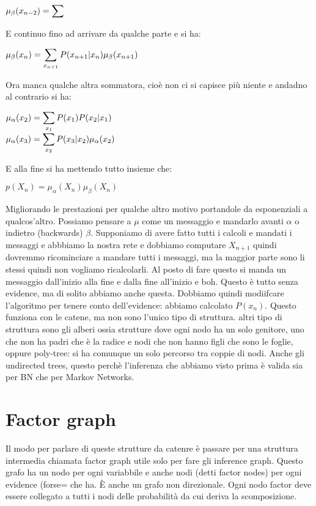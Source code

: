 \begin{center}
	$\displaystyle \mu_\beta(x_{n-2})=\displaystyle\sum$
\end{center}
E continuo fino ad arrivare da qualche parte e si ha:
\begin{center}
	$\displaystyle \mu_\beta(x_n)=\displaystyle\sum_{x_{n+1}}P(x_{n+1}\vert x_n)\mu_\beta(x_{n+1})$
\end{center}
Ora manca qualche altra sommatora, cioè non ci si capisce più niente e andadno al contrario si ha:
\begin{center}
	$\displaystyle \mu_\alpha(x_2)=\displaystyle\sum_{x_1}P(x_1)P(x_2\vert x_1)$\\
	$\displaystyle \mu_\alpha(x_3)=\displaystyle\sum_{x_2}P(x_3\vert x_2)\mu_\alpha(x_2)$
\end{center}
E alla fine si ha mettendo tutto insieme che:
\begin{center}
	$\displaystyle p(X_n)=\mu_\alpha(X_n)\mu_\beta(X_n)$
\end{center}
Migliorando le prestazioni per qualche altro motivo portandole da esponenziali a qualcos'altro.\newline 
Possiamo pensare a $\mu$ come un messaggio e mandarlo avanti $\alpha$ o indietro (backwards) $\beta$.\newline
Supponiamo di avere fatto tutti i calcoli e mandati i messaggi e abbbiamo la nostra rete e dobbiamo computare $X_{n+1}$ quindi dovremmo ricominciare a mandare tutti i messaggi, ma la maggior parte sono li stessi quindi non vogliamo ricalcolarli. Al posto di fare questo si manda un messaggio dall'inizio alla fine e dalla fine all'inizio e boh. \newline
Questo è tutto senza evidence, ma di solito abbiamo anche questa. Dobbiamo quindi modiifcare l'algoritmo per tenere conto dell'evidence: abbiamo calcolato $P(x_n)$.\newline
Questo funziona con le catene, ma non sono l'unico tipo di struttura. altri tipo di struttura sono gli alberi ossia strutture dove ogni nodo ha un solo genitore, uno che non ha padri che è la radice e nodi che non hanno figli che sono le foglie, oppure poly-tree: si ha comunque un solo percorso tra coppie di nodi. Anche gli undirected trees, questo perchè l'inferenza che abbiamo visto prima è valida sia per BN che per Markov Networks. 
\section{Factor graph}
Il modo per parlare di queste strutture da catenre è passare per una struttura intermedia chiamata factor graph utile solo per fare gli inference graph. \newline
Questo grafo ha un nodo per ogni variabbile e anche nodi (detti factor nodes) per ogni evidence (forse= che ha. È anche un grafo non direzionale. \newline
Ogni nodo factor deve essere collegato a tutti i nodi delle probabilità da cui deriva la scomposizione. 
